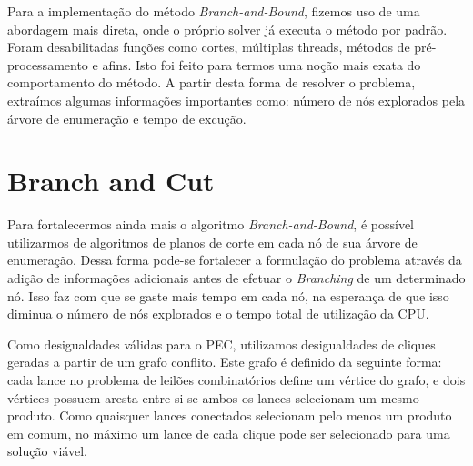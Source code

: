 \documentclass{article}
\newenvironment{algoritmo}[1][]
  {\begin{algorithm}[#1]
     \selectlanguage{brazil}%
     \floatname{algorithm}{Algoritmo}%
  }
  {\end{algorithm}}
\begin{document}
	
	Para a implementação do método \emph{Branch-and-Bound}, fizemos uso de uma abordagem mais direta, onde o próprio solver já executa o método por padrão. Foram desabilitadas funções como cortes, múltiplas threads, métodos de pré-processamento e afins. Isto foi feito para termos uma noção mais exata do comportamento do método. A partir desta forma de resolver o problema, extraímos algumas informações importantes como: número de nós explorados pela árvore de enumeração e tempo de excução.
	
	
	
	\section{Branch and Cut}\label{sec:BC}
	Para fortalecermos ainda mais o algoritmo \emph{Branch-and-Bound}, é possível utilizarmos de algoritmos de planos de corte em cada nó de sua árvore de enumeração. Dessa forma pode-se fortalecer a formulação do problema através da adição de informações adicionais antes de efetuar o \emph{Branching} de um determinado nó. Isso faz com que se gaste mais tempo em cada nó, na esperança de que isso diminua o número de nós explorados e o tempo total de utilização da CPU.
	
	Como desigualdades válidas para o PEC, utilizamos desigualdades de cliques geradas a partir de um grafo conflito. Este grafo é definido da seguinte forma: cada lance no problema de leilões combinatórios define um vértice do grafo,
	e dois vértices possuem aresta entre si se ambos os lances selecionam um mesmo produto. Como quaisquer lances conectados selecionam pelo menos um produto em comum, no máximo um lance de cada clique pode ser selecionado para uma solução viável.
	

            
\end{document}
